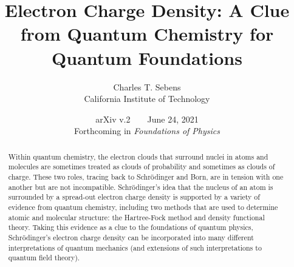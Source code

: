 \documentclass[12pt,onecolumn,secnumarabic,amsmath,amssymb,balancelastpage,nofootinbib]{article}
\begin{document}
\sloppy %



\newlength{\bibitemsep}\setlength{\bibitemsep}{.2\baselineskip plus .05\baselineskip minus .05\baselineskip}
\newlength{\bibparskip}\setlength{\bibparskip}{0pt}
\let\oldthebibliography\thebibliography
\renewcommand\thebibliography[1]{%
  \oldthebibliography{#1}%
  \setlength{\parskip}{\bibitemsep}%
  \setlength{\itemsep}{\bibparskip}%
}



\title{{Electron Charge Density: A Clue from Quantum Chemistry for Quantum Foundations}}
\author{Charles T. Sebens\\California Institute of Technology}
\date{\vspace*{-6 pt}arXiv v.2\ \ \ \ June 24, 2021\vspace*{10 pt}\\Forthcoming in \textit{Foundations of Physics}}


\maketitle

\begin{abstract}	
Within quantum chemistry, the electron clouds that surround nuclei in atoms and molecules are sometimes treated as clouds of probability and sometimes as clouds of charge.  These two roles, tracing back to Schr\"{o}dinger and Born, are in tension with one another but are not incompatible.  Schr\"{o}dinger's idea that the nucleus of an atom is surrounded by a spread-out electron charge density is supported by a variety of evidence from quantum chemistry, including two methods that are used to determine atomic and molecular structure: the Hartree-Fock method and density functional theory.  Taking this evidence as a clue to the foundations of quantum physics, Schr\"{o}dinger's electron charge density can be incorporated into many different interpretations of quantum mechanics (and extensions of such interpretations to quantum field theory).
\end{abstract}
\thispagestyle{empty}
\newpage
\tableofcontents
\newpage
\end{document}
